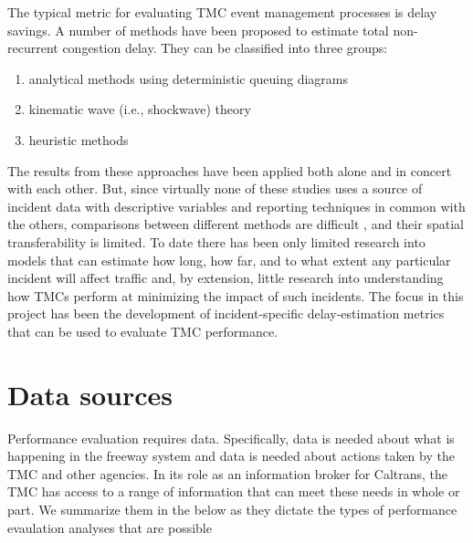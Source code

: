 \documentclass[12pt]{report}
\begin{document}
The typical metric for evaluating TMC event management processes is delay
savings. A number of methods have been proposed to estimate total non-recurrent
congestion delay.  They can be classified into three groups:
\begin{enumerate}
\item analytical methods using deterministic queuing diagrams
  \protect\citep[e.g.,]{goolsby71:_influen_of_incid_freew_qualit_of_servic,chow74:_study_of_traff_perfor_model,morales87:_analy_proced_for_estim_freew_traff_conges,trb94:_highw_capac_manual,lawson97:_using_input_output_diagr_to,erera98:_simpl_gener_method_for_analy,skabardonis04:_devel_and_applic_of_method}
\item kinematic wave (i.e., shockwave) theory \citep[e.g.,]{chow74:_study_of_traff_perfor_model,wirasinghe78:_deter_of_traff_delay_from,heydecker94:_incid_and_inter_freew,al-deek95:_new_method_for_estim_freew_incid_conges}
\item heuristic methods \citep[e.g.,]{skabardonis96:_i_field_exper,skabardonis03:_measur_recur_and_nonrec_traff_conges}
\end{enumerate}
The results from these approaches have been applied both alone and in concert
with each other. But, since virtually none of these studies uses a source of
incident data with descriptive variables and reporting techniques in common with
the others, comparisons between different methods are difficult
\citep{goolsby71:_influen_of_incid_freew_qualit_of_servic}, and their spatial
transferability is limited. To date there has been only limited research into
models that can estimate how long, how far, and to what extent any particular
incident will affect traffic and, by extension, little research into
understanding how TMCs perform at minimizing the impact of such incidents.  The
focus in this project has been the development of incident-specific
delay-estimation metrics that can be used to evaluate TMC performance.


\section{Data sources}
\label{sec:data-sources}

Performance evaluation requires data.  Specifically, data is needed about what
is happening in the freeway system and data is needed about actions taken by the
TMC and other agencies.  In its role as an information broker for Caltrans, the
TMC has access to a range of information that can meet these needs in whole or
part.  We summarize them in the below as they dictate the types of performance
evaulation analyses that are possible
\end{document}
